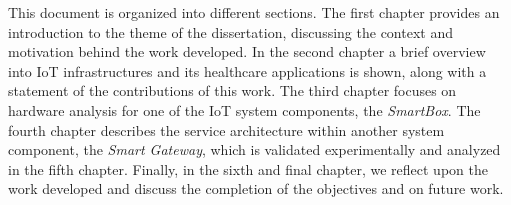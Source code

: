 This document is organized into different sections. The first chapter provides an introduction to the theme of the dissertation, discussing the context and motivation behind the work developed. In the second chapter a brief overview into \acs{IoT} infrastructures and its healthcare applications is shown, along with a statement of the contributions of this work. The third chapter focuses on hardware analysis for one of the \acs{IoT} system components, the \textit{SmartBox}. The fourth chapter describes the service architecture within another system component, the \textit{Smart Gateway}, which is validated experimentally and analyzed in the fifth chapter.
Finally, in the sixth and final chapter, we reflect upon the work developed and discuss the completion of the objectives and on future work.